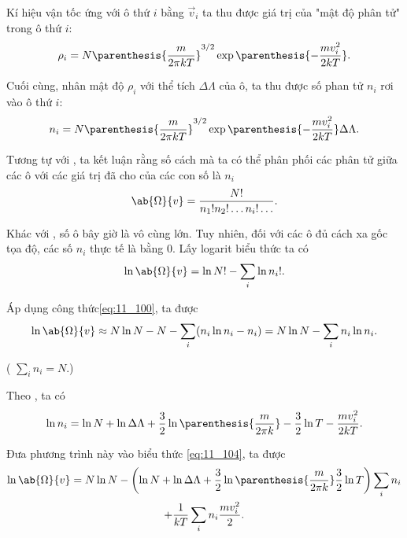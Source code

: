 \noindent
Kí hiệu vận tốc ứng với ô thứ $i$ bằng $\vec{v}_i$ ta thu được giá trị của "mật độ phân tử" trong ô thứ $i$:
\begin{equation*}
	\rho_i = N \parenthesis{\frac{m}{2\pi kT}}^{3/2} \exp\parenthesis{-\frac{mv_i^2}{2kT}}.
\end{equation*}

\noindent
Cuối cùng, nhân mật độ $\rho_i$ với thể tích $\Delta\Lambda$ của ô, ta thu được số phan tử $n_i$ rơi vào ô thứ $i$:
\begin{equation}\label{eq:11_102}
	n_i = N \parenthesis{\frac{m}{2\pi kT}}^{3/2} \exp\parenthesis{-\frac{mv_i^2}{2kT}} \Delta\Lambda.
\end{equation}

\noindent
Tương tự với , ta kết luận rằng số cách mà ta có thể phân phối các phân tử giữa các ô với các giá trị đã cho của các con số là $n_i$ 
\vspace{-12pt} \\
\begin{equation}\label{eq:11_103}
	\ab{\Omega}{v} = \frac{N!}{n_1! n_2! \ldots n_i! \ldots}.
\end{equation}

\noindent
Khác với , số ô bây giờ là vô cùng lớn. Tuy nhiên, đối với các ô đủ cách xa gốc tọa độ, các số $n_i$ thực tế là bằng $0$. Lấy logarit biểu thức  ta có
\begin{equation*}
	\ln{\ab{\Omega}{v}} = \ln{N!} - \sum_i \ln{n_i!}.
\end{equation*}

\noindent
Áp dụng công thức\eqref{eq:11_100}, ta được
\begin{equation}\label{eq:11_104}
	\ln{\ab{\Omega}{v}} \approx N\ln{N} - N - \sum_i (n_i \ln{n_i} - n_i) = N\ln{N} - \sum_i n_i\ln{n_i}.
\end{equation}

\noindent
( $\sum_in_i=N$.)

Theo , ta có
\begin{equation*}
	\ln{n_i} = \ln{N} + \ln{\Delta\Lambda} + \frac{3}{2}\ln\parenthesis{\frac{m}{2\pi k}} - \frac{3}{2}\ln{T} - \frac{mv_i^2}{2kT}.
\end{equation*}

\noindent
Đưa phương trình này vào biểu thức \eqref{eq:11_104}, ta được
\begin{multline}
	\ln{\ab{\Omega}{v}} = N\ln{N} - \left(\ln{N} + \ln{\Delta\Lambda} + \frac{3}{2}\ln\parenthesis{\frac{m}{2\pi k}}	\frac{3}{2}\ln{T}\right) \sum_in_i\\
	+ \frac{1}{kT}\sum_i n_i \frac{mv_i^2}{2}.\label{eq:11_105}
\end{multline}

